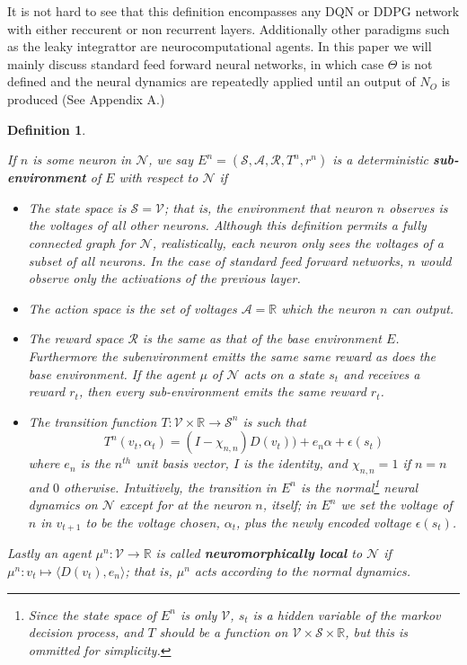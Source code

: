 \documentclass{article} %
\newtheorem{definition}[theorem]{Definition}
\numberwithin{equation}{subsection}
\numberwithin{theorem}{subsection}
\def\reals{{\mathbb R}}
\theoremstyle{named}
\def\scriptv{{\mathcal V}}
\def\scripta{{\mathcal A}}
\def\scriptr{{\mathcal R}}
\def\scriptn{{\mathcal N}}
\def\scripts{{\mathcal S}}
\begin{document}
It is not hard to see that this definition encompasses any DQN or DDPG network with either reccurent or non recurrent layers. Additionally other paradigms such as the leaky integrattor are neurocomputational agents. In this paper we will mainly discuss standard feed forward neural networks, in which case $\Theta$ is not defined and the neural dynamics are repeatedly applied until an output of $N_O$ is produced (See Appendix A.)


\begin{definition}\label{def:subenv}

 If $n$ is some neuron in $\scriptn$, we say $E^n = (\scripts, \scripta, \scriptr, T^n, r^n)$ is a deterministic \textbf{sub-environment} of $E$ with respect to $\scriptn$ if

\begin{itemize}
  \item The state space is $\scripts = \scriptv$;  that is, the environment that neuron $n$ observes is the voltages of all other neurons. Although this definition permits a fully connected graph for $\scriptn$, realistically, each neuron only sees the voltages of a subset of all neurons. In the case of standard feed forward networks, $n$ would observe only the activations of the previous layer.

  \item The action space is the set of voltages $\scripta = \reals$ which the neuron $n$ can output.
  \item The reward space $\scriptr$ is the same as that of the base environment $E$. Furthermore the subenvironment emitts the same same reward as does the base environment. If the agent $\mu$ of $\scriptn$ acts on a state $s_t$ and receives a reward $r_t$, then every sub-environment emits the same reward $r_t$.
  \item The transition function $T : \scriptv \times \mathbb{R}  \to \scripts ^n$ is such that
  \begin{equation}
    T^n(v_t, \alpha_t) = (I - \chi_{n,n}) D(v_t)) + e_n \alpha + \epsilon(s_t)
  \end{equation}
  where $e_n$ is the $n^{th}$ unit basis vector, $I$ is the identity, and $\chi_{n,n} =1$ if $n = n$ and $0$ otherwise. Intuitively, the transition in $E^n$ is the normal\footnote{Since the state space of $E^n$ is only
  $\scriptv$, $s_t$ is a hidden variable of the markov decision process, and $T$ should be a function on $\scriptv \times \scripts \times \mathbb{R}$, but this is ommitted for simplicity.} neural dynamics on $\scriptn$ except for at the neuron $n$, itself; in $E^n$ we set the voltage of $n$ in $v_{t+1}$ to be the voltage chosen, $\alpha_t$, plus the newly encoded voltage $\epsilon(s_t)$.
\end{itemize}
 Lastly an agent  $\mu^n: \scriptv \to \mathbb{R}$  is called \textbf{neuromorphically local} to $\scriptn$ if $\mu^n: v_t \mapsto \langle D(v_t), e_n \rangle$; that is, $\mu^n$ acts according to the normal dynamics.

\end{definition}
\end{document}
